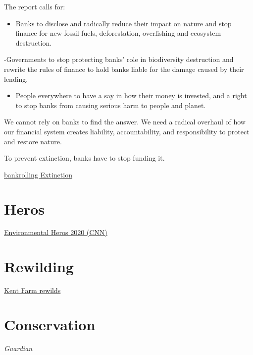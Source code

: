 \documentclass[
]{book}
\providecommand{\tightlist}{%
  \setlength{\itemsep}{0pt}\setlength{\parskip}{0pt}}
\begin{document}
The report calls for:

\begin{itemize}
\tightlist
\item
  Banks to disclose and radically reduce their
  impact on nature and stop finance for new
  fossil fuels, deforestation, overfishing and
  ecosystem destruction.
\end{itemize}

-Governments to stop protecting banks' role
in biodiversity destruction and rewrite the
rules of finance to hold banks liable for the
damage caused by their lending.

\begin{itemize}
\tightlist
\item
  People everywhere to have a say in how
  their money is invested, and a right to stop
  banks from causing serious harm to people
  and planet.
\end{itemize}

We cannot rely on banks to find the answer. We need
a radical overhaul of how our financial system creates
liability, accountability, and responsibility to protect
and restore nature.

To prevent extinction, banks have to stop
funding it.

\href{https://portfolio.earth/campaigns/bankrolling-extinction/}{bankrolling Extinction}

\hypertarget{heros}{%
\section{Heros}\label{heros}}

\href{https://edition.cnn.com/2020/12/31/world/new-years-resolution-2021-heal-nature-c2e-spc-intl/index.html}{Environmental Heros 2020 (CNN)}

\hypertarget{rewilding}{%
\section{Rewilding}\label{rewilding}}

\href{https://edition.cnn.com/2020/10/01/world/knepp-farm-rewilding-scn-cte-spc/index.html}{Kent Farm rewilds}

\hypertarget{conservation}{%
\section{Conservation}\label{conservation}}

\emph{Guardian}
\end{document}
